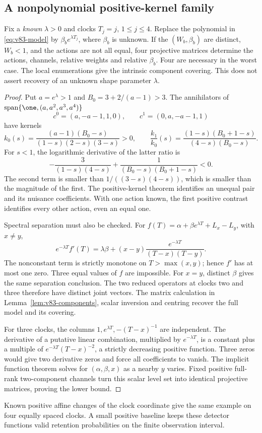 \subsection{A nonpolynomial positive-kernel family}
\begin{proposition}\label{prop:v83-exponential}
Fix a \emph{known} $\lambda>0$ and clocks $T_j=j$, $1\le j\le4$.
Replace the polynomial in \eqref{eq:v83-model} by
$\beta_b e^{\lambda T_j}$, where $\beta_b$ is unknown. If the
$(W_b,\beta_b)$ are distinct, $W_b<1$, and the actions are not all
equal, four projective matrices determine the actions, channels,
relative weights and relative $\beta_b$. Four are necessary in the
worst case. The local enumerations give the intrinsic component
covering. This does not assert recovery of an unknown shape parameter
$\lambda$.
\end{proposition}
\begin{proof}
Put $a=e^\lambda>1$ and $B_0=3+2/(a-1)>3$. The annihilators of
$\operatorname{span}\{\one,(a,a^2,a^3,a^4)\}$
\[
 c^0=(a,-a-1,1,0),\qquad c^1=(0,a,-a-1,1)
\]
have kernels
\[
 k_0(s)=\frac{(a-1)(B_0-s)}{(1-s)(2-s)(3-s)}>0,\qquad
 \frac{k_1}{k_0}(s)=\frac{(1-s)(B_0+1-s)}{(4-s)(B_0-s)}.
\]
For $s<1$, the logarithmic derivative of the latter ratio is
\[
 -\frac{3}{(1-s)(4-s)}+
       \frac{1}{(B_0-s)(B_0+1-s)}<0.
\]
The second term is smaller than $1/((3-s)(4-s))$, which is smaller
than the magnitude of the first. The positive-kernel theorem identifies
an unequal pair and its nuisance coefficients. With one action known,
the first positive contrast identifies every other action, even an
equal one.

Spectral separation must also be checked. For
$f(T)=\alpha+\beta e^{\lambda T}+L_x-L_y$, with $x\ne y$,
\[
 e^{-\lambda T}f'(T)=\lambda\beta+
 (x-y)\frac{e^{-\lambda T}}{(T-x)(T-y)}.
\]
The nonconstant term is strictly monotone on $T>\max(x,y)$; hence
$f'$ has at most one zero. Three equal values of $f$ are impossible.
For $x=y$, distinct $\beta$ gives the same separation conclusion.
The two reduced operators at clocks two and three therefore have
distinct joint vectors. The matrix calculation in
Lemma~\ref{lem:v83-components}, scalar inversion and centring recover
the full model and its covering.

For three clocks, the columns $1,e^{\lambda T},-(T-x)^{-1}$ are
independent. The derivative of a putative linear combination, multiplied
by $e^{-\lambda T}$, is a constant plus a multiple of
$e^{-\lambda T}(T-x)^{-2}$, a strictly decreasing positive function.
Three zeros would give two derivative zeros and force all coefficients
to vanish. The implicit function theorem solves for
$(\alpha,\beta,x)$ as a nearby $y$ varies. Fixed positive full-rank
two-component channels turn this scalar level set into identical
projective matrices, proving the lower bound.
\end{proof}
Known positive affine changes of the clock coordinate give the same
example on four equally spaced clocks. A small positive baseline keeps
these detector functions valid retention probabilities on the finite
observation interval.
